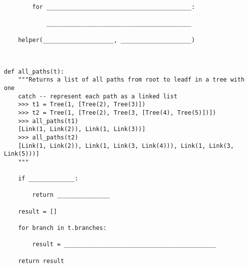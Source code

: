 \documentclass{exam}
\begin{document}
\begin{questions}
\begin{blocksection}
\begin{lstlisting}
        for _________________________________________:

            _________________________________________

    helper(____________________, ____________________)



\end{lstlisting}
\end{blocksection}

\begin{blocksection}
\question
\begin{lstlisting}
def all_paths(t):
    """Returns a list of all paths from root to leadf in a tree with one 
    catch -- represent each path as a linked list
    >>> t1 = Tree(1, [Tree(2), Tree(3)])
    >>> t2 = Tree(1, [Tree(2), Tree(3, [Tree(4), Tree(5)])])
    >>> all_paths(t1)
    [Link(1, Link(2)), Link(1, Link(3))]
    >>> all_paths(t2)
    [Link(1, Link(2)), Link(1, Link(3, Link(4))), Link(1, Link(3, Link(5)))]
    """

    if _____________:

        return _______________

    result = []

    for branch in t.branches:

        result = ___________________________________________

    return result

\end{lstlisting}
\end{blocksection}




\end{questions}


\end{document}

